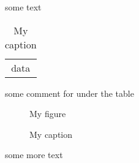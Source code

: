 \documentclass{article}
\begin{document}
	some text

\begin{table}
  	\caption{My caption}
	\begin{tabular}{c}
		data
	\end{tabular}
	
	some comment for under the table
	
\end{table}

\begin{figure}
	\centering
	My figure
  	\caption{My caption}
	\label{fig}
	
\end{figure}
		
some more text
\end{document}
